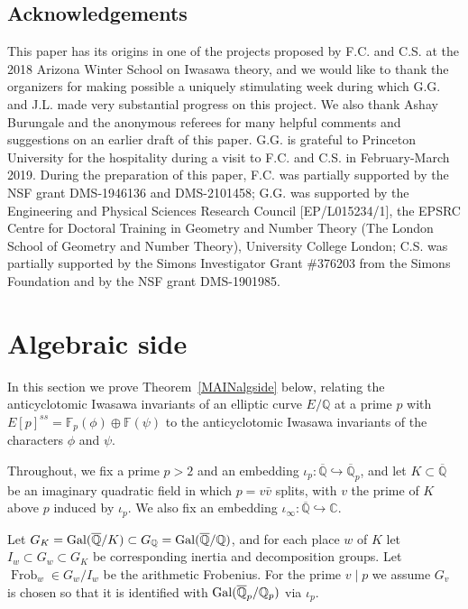 \documentclass[10pt]{amsart}
\numberwithin{equation}{section}
\theoremstyle{definition}
\theoremstyle{remark}
\renewcommand{\thetheorem}{\arabic{section}.\arabic{subsection}.\arabic{theorem}}
\newcommand{\Q}{\mathbb{Q}}
\newcommand{\C}{\mathbb{C}}
\DeclareMathOperator{\Frob}{Frob}
\begin{document}
\subsection{Acknowledgements}
This paper has its origins in one of the projects proposed by F.C. and C.S. at the 2018 Arizona Winter School on Iwasawa theory, and we would like to thank the organizers for making possible a uniquely stimulating week during which G.G. and J.L. made very substantial progress on this project. 
{We also thank Ashay Burungale and the anonymous referees for many helpful comments and suggestions on an earlier draft of this paper.}
G.G. is grateful to Princeton University for the hospitality during a visit to F.C. and C.S. in February-March 2019. During the preparation of this paper, F.C. was partially supported by the NSF grant DMS-1946136 and DMS-2101458; G.G. was supported by the Engineering and Physical Sciences Research Council [EP/L015234/1], the EPSRC Centre for Doctoral Training in Geometry and Number Theory (The London School of Geometry and Number Theory), University College London;
C.S. was partially supported by the Simons Investigator Grant \#376203 from the Simons Foundation and by the NSF grant DMS-1901985.



\renewcommand{\thetheorem}{\arabic{section}.\arabic{subsection}.\arabic{theorem}}


\section{Algebraic side}\label{sec:algebraic}

In this section we prove Theorem~\ref{MAINalgside} below, relating the anticyclotomic Iwasawa invariants of an elliptic curve $E/\Q$ at a prime $p$ with $E[p]^{ss}=\mathbb{F}_p(\phi)\oplus\mathbb{F}(\psi)$ to the anticyclotomic Iwasawa invariants of the characters $\phi$ and $\psi$. 

Throughout, we fix a prime $p>2$ and an embedding $\iota_p:\overline{\Q}\hookrightarrow\overline{\Q}_p$, and let $K\subset\overline{\Q}$ be an imaginary quadratic field in which $p=v\bar{v}$ splits, with $v$ the prime of $K$ above $p$ induced by $\iota_p$.  We also fix an embedding $\iota_\infty:\overline{\Q}\hookrightarrow \C$.

Let $G_K = {\rm Gal}(\overline{\Q}/K)\subset G_\Q = {\rm Gal}(\overline{\Q}/\Q)$, and for each place $w$ of $K$ let $I_w\subset G_w\subset G_K$ be
corresponding inertia and decomposition groups. Let $\Frob_w\in G_w/I_w$ be the arithmetic Frobenius. For the prime $v\mid p$ we assume 
$G_v$ is chosen so that it is identified with ${\rm Gal}(\overline{\Q}_p/\Q_p)$ via $\iota_p$.
\end{document}
